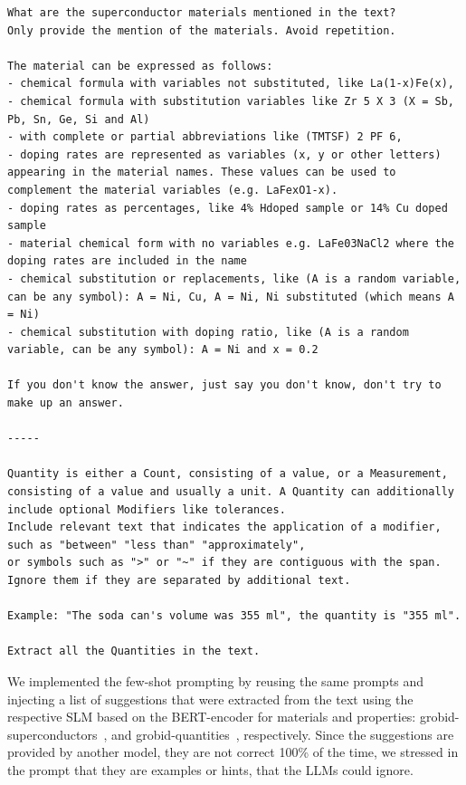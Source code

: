 \documentclass[a4paper]{article}
\begin{document}
\begin{lstlisting}[caption=User prompt designed for extracting materials and properties]
What are the superconductor materials mentioned in the text? 
Only provide the mention of the materials. Avoid repetition. 

The material can be expressed as follows:
- chemical formula with variables not substituted, like La(1-x)Fe(x),
- chemical formula with substitution variables like Zr 5 X 3 (X = Sb, Pb, Sn, Ge, Si and Al)
- with complete or partial abbreviations like (TMTSF) 2 PF 6,
- doping rates are represented as variables (x, y or other letters) appearing in the material names. These values can be used to complement the material variables (e.g. LaFexO1-x).
- doping rates as percentages, like 4% Hdoped sample or 14% Cu doped sample
- material chemical form with no variables e.g. LaFe03NaCl2 where the doping rates are included in the name
- chemical substitution or replacements, like (A is a random variable, can be any symbol): A = Ni, Cu, A = Ni, Ni substituted (which means A = Ni)
- chemical substitution with doping ratio, like (A is a random variable, can be any symbol): A = Ni and x = 0.2

If you don't know the answer, just say you don't know, don't try to make up an answer.

-----

Quantity is either a Count, consisting of a value, or a Measurement, 
consisting of a value and usually a unit. A Quantity can additionally include optional Modifiers like tolerances.
Include relevant text that indicates the application of a modifier, such as "between" "less than" "approximately", 
or symbols such as ">" or "~" if they are contiguous with the span. Ignore them if they are separated by additional text.
 
Example: "The soda can's volume was 355 ml", the quantity is "355 ml".

Extract all the Quantities in the text.
\end{lstlisting}

We implemented the few-shot prompting by reusing the same prompts and injecting a list of suggestions that were extracted from the text using the respective SLM based on the BERT-encoder for materials and properties: grobid-superconductors~\cite{lfoppiano2023automatic}, and grobid-quantities~\cite{foppiano2019quantities}, respectively.
Since the suggestions are provided by another model, they are not correct 100\% of the time, we stressed in the prompt that they are examples or hints, that the LLMs could ignore. 
\end{document}
